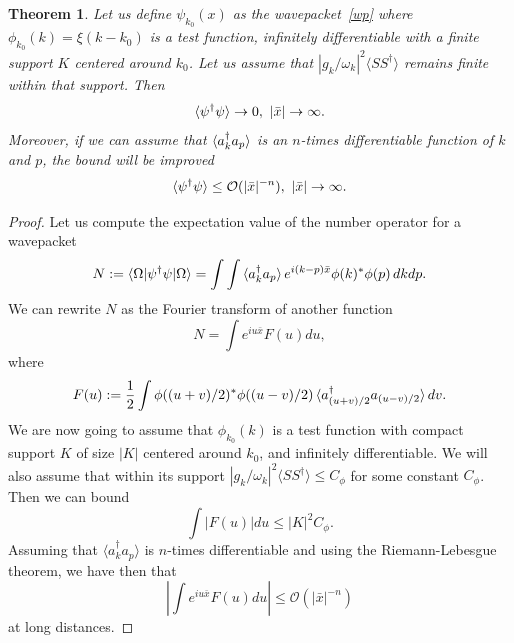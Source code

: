 \documentclass[notitlepage, prx, preprint, amsmath,superscriptaddress,amssymb]{revtex4-1}
\newtheorem{theorem}{Theorem}[section]
\begin{document}
\begin{theorem}
\label{theo:bound-x}
Let us define $\psi_{k_0}(x)$ as the wavepacket\ \eqref{wp} where $\phi_{k_0}(k)=\xi(k-k_0)$ is a test function, infinitely differentiable with a finite support $K$ centered around $k_0$. Let us assume that $|g_k/\omega_k|^2\langle S S^\dagger \rangle$ remains finite within that support. Then
\begin{equation}
\label{nx}
\braket{\psi^\dagger \psi} \to 0,~|\bar x|\to\infty.
\end{equation}
Moreover, if we can assume that $\braket{a_k^\dagger a_p}$ is an $n$-times differentiable function of $k$ and $p$, the bound will be improved
\begin{equation}
\label{nx-imp}
\braket{\psi^\dagger \psi} \leq  \mathcal{O}(|\bar x|^{-n}), ~|\bar x|\to\infty.
\end{equation}
\end{theorem}

\begin{proof}
Let us compute the expectation value of the number operator for a wavepacket
\begin{equation}
N := \braket{\Omega|\psi^\dagger\psi|\Omega}
= \int\int\braket{a_k^\dagger a_p} e^{i(k-p)\bar x} \phi(k)^*\phi(p)\,dk dp.
\end{equation}
We can rewrite $N$ as the Fourier transform of another function
\begin{equation}
N = \int e^{i u \bar x} F(u) du,
\end{equation}
where
\begin{equation}
F(u) := \frac{1}{2} \int \phi((u+v)/2)^*\phi((u-v)/2)
\braket{a_{(u+v)/2}^\dagger a_{(u-v)/2}}dv.
\end{equation}
We are now going to assume that $\phi_{k_0}(k)$ is a test function with compact support $K$ of size $|K|$ centered around $k_0$, and infinitely differentiable. We will also assume that within its support $|g_k/\omega_k|^2 \langle S S^\dagger \rangle \leq C_\phi$ for some constant $C_\phi$. Then we can bound
\begin{equation}
\int |F(u)|du \leq |K|^2 C_\phi.
\end{equation}
Assuming that $\langle a_k^\dagger a_p\rangle$ is $n$-times differentiable and 
using the Riemann-Lebesgue theorem, we have then that
\begin{equation}
\left|\int e^{i u \bar x} F(u)du\right| \leq \mathcal{O}\left(|\bar x|^{-n}\right)
\end{equation}
at long distances. 
\end{proof}
\end{document}
